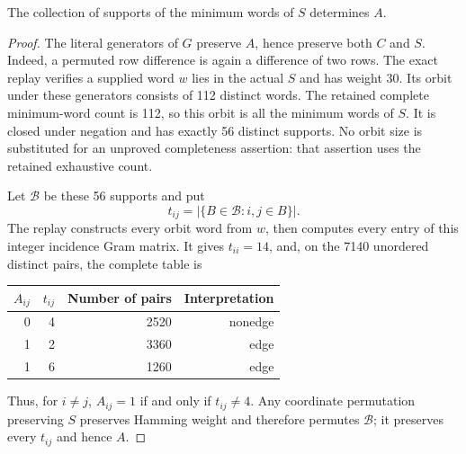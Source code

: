 \documentclass[11pt]{article}
\begin{document}
\newpage
\begin{lemma}\label{support}
The collection of supports of the minimum words of $S$ determines $A$.
\end{lemma}
\begin{proof}
The literal generators of $G$ preserve $A$, hence preserve both $C$ and $S$. Indeed, a permuted row difference is again a difference of two rows. The exact replay verifies a supplied word $w$ lies in the actual $S$ and has weight 30. Its orbit under these generators consists of 112 distinct words. The retained complete minimum-word count is 112, so this orbit is all the minimum words of $S$. It is closed under negation and has exactly 56 distinct supports. No orbit size is substituted for an unproved completeness assertion: that assertion uses the retained exhaustive count.

Let $\mathcal B$ be these 56 supports and put
\[
 t_{ij}=|\{B\in\mathcal B:i,j\in B\}|.
\]
The replay constructs every orbit word from $w$, then computes every entry of this integer incidence Gram matrix. It gives $t_{ii}=14$, and, on the 7140 unordered distinct pairs, the complete table is
\begin{center}\begin{tabular}{rrrr}\toprule
$A_{ij}$&$t_{ij}$&Number of pairs&Interpretation\\\midrule
0&4&2520&nonedge\\
1&2&3360&edge\\
1&6&1260&edge\\\bottomrule
\end{tabular}\end{center}
Thus, for $i\ne j$, $A_{ij}=1$ if and only if $t_{ij}\ne4$. Any coordinate permutation preserving $S$ preserves Hamming weight and therefore permutes $\mathcal B$; it preserves every $t_{ij}$ and hence $A$.
\end{proof}
\end{document}
